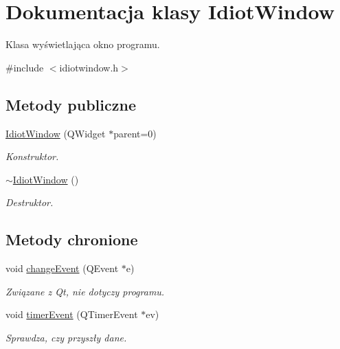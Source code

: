\hypertarget{class_idiot_window}{
\section{Dokumentacja klasy IdiotWindow}
\label{class_idiot_window}
}


Klasa wyświetlająca okno programu.  




{\ttfamily \#include $<$idiotwindow.h$>$}

\subsection*{Metody publiczne}
\begin{DoxyCompactItemize}
\item 
\hyperlink{class_idiot_window_a028f2a727c252dcb9448a08d1379d699}{IdiotWindow} (QWidget $\ast$parent=0)
\begin{DoxyCompactList}\small\item\em Konstruktor. \item\end{DoxyCompactList}\item 
\hyperlink{class_idiot_window_a2a5adb99723cac75bcf4c843653ef76b}{$\sim$IdiotWindow} ()
\begin{DoxyCompactList}\small\item\em Destruktor. \item\end{DoxyCompactList}\end{DoxyCompactItemize}
\subsection*{Metody chronione}
\begin{DoxyCompactItemize}
\item 
\hypertarget{class_idiot_window_a67aa3314cc4dc981af280288f6f16b96}{
void \hyperlink{class_idiot_window_a67aa3314cc4dc981af280288f6f16b96}{changeEvent} (QEvent $\ast$e)}
\label{class_idiot_window_a67aa3314cc4dc981af280288f6f16b96}

\begin{DoxyCompactList}\small\item\em Związane z Qt, nie dotyczy programu. \item\end{DoxyCompactList}\item 
void \hyperlink{class_idiot_window_a0e90dfa970f643c1d42d1449d648cf50}{timerEvent} (QTimerEvent $\ast$ev)
\begin{DoxyCompactList}\small\item\em Sprawdza, czy przyszły dane. \item\end{DoxyCompactList}\end{DoxyCompactItemize}


